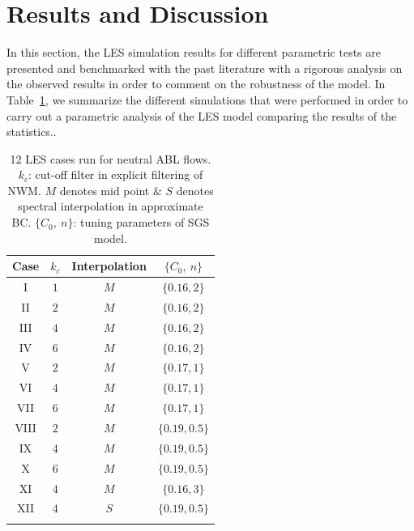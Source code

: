 \section{Results and Discussion}\label{results}
{In this section, the LES simulation results for different parametric tests {are} presented and benchmarked with the past literature with a rigorous analysis on the observed results in order to comment on the robustness of the model. 
{In Table~\ref{table:sim}, we summarize} the different simulations {that were} performed in order to carry out a parametric analysis of the LES model comparing the results of the statistics.}.   
\begin{table}[ht] 
\centering %
\begin{tabular}{c c c c} %
\hline\hline    %
Case & $k_c$  & Interpolation & $\lbrace C_0, \ n \rbrace$   \\ [0.5 ex] %
\hline  %
I & $1$ & $M$ & $\lbrace 0.16, 2 \rbrace$ \\
II & $2$ & $M$ & $\lbrace 0.16, 2 \rbrace$ \\
III & $4$ & $M$ & $\lbrace 0.16, 2 \rbrace$ \\  %
IV & $6$ & $M$ & $\lbrace 0.16, 2 \rbrace$ \\
\hline
V & $2$ & $M$ & $\lbrace 0.17, 1 \rbrace$ \\
VI & $4$ & $M$ & $\lbrace 0.17, 1 \rbrace$ \\
VII & $6$ & $M$ & $\lbrace 0.17, 1 \rbrace$ \\
\hline

VIII & $2$ & $M$ & $\lbrace 0.19, 0.5 \rbrace$ \\
IX & $4$ & $M$ & $\lbrace 0.19, 0.5 \rbrace$ \\
X & $6$ & $M$ & $\lbrace 0.19, 0.5 \rbrace$ \\
\hline
XI & $4$ & $M$ & $\lbrace 0.16, 3 \rbrace$ \\
\hline
XII & $4$ & $S$ & $\lbrace 0.19, 0.5 \rbrace$  \\
\hline \\ [1 ex]
\end{tabular} 
\caption[Cases in ABL simulation]{12 LES cases run for neutral ABL flows. $k_c$: cut-off filter in explicit filtering of NWM. $M$ denotes mid point $\&$ $S$ denotes spectral interpolation in approximate BC. $\lbrace C_0, \ n \rbrace$: tuning parameters of SGS model. } %
\label{table:sim} %
\end{table} 

